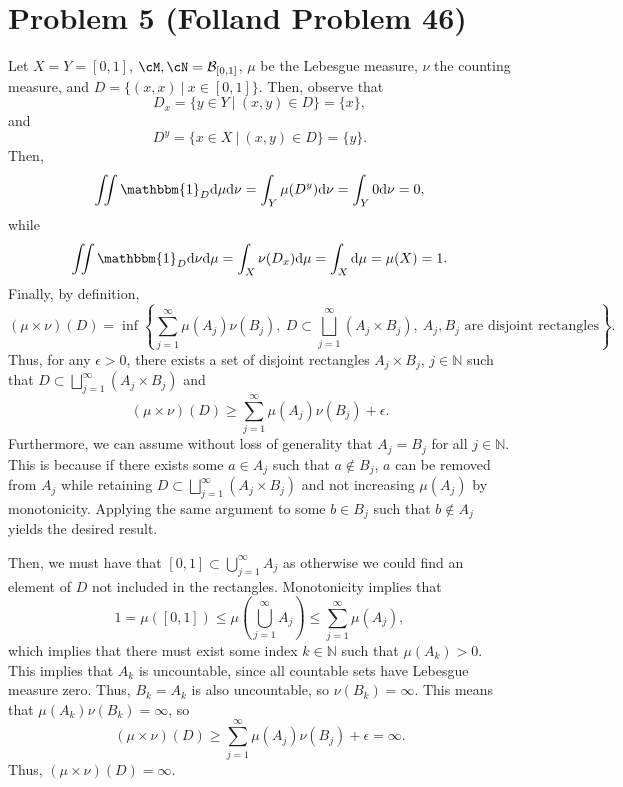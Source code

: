 \documentclass{article}
\begin{document}
\section{Problem 5 (Folland Problem 46)}
Let $X=Y=[0,1]$, $\cM,\cN=\cB_{[0,1]}$, $\mu$ be the Lebesgue measure, $\nu$ the counting measure, and $D=\{(x,x)~|~x\in[0,1]\}$. Then, observe that
\[
D_x=\{y\in Y~|~(x,y)\in D\}=\{x\},
\]
and 
\[
D^y=\{x\in X~|~(x,y)\in D\}=\{y\}.
\]
Then,
\[
\iint\mathbbm{1}_D\df\mu\df\nu=\int_Y\mu(D^y)\df\nu=\int_Y0\df\nu=0,
\]
while
\[
\iint\mathbbm{1}_D\df\nu\df\mu=\int_X\nu(D_x)\df\mu=\int_X\df\mu=\mu(X)=1.
\]
Finally, by definition,
\[
(\mu\times\nu)(D)=\inf\left\{\sum_{j=1}^\infty\mu(A_j)\nu(B_j),~D\subset\bigsqcup_{j=1}^\infty(A_j\times B_j),~A_j,B_j\text{ are disjoint rectangles}\right\}.
\]
Thus, for any $\epsilon>0$, there exists a set of disjoint rectangles $A_j\times B_j$, $j\in\mathbb{N}$ such that  $D\subset \bigsqcup_{j=1}^\infty(A_j\times B_j)$ and 
\[
(\mu\times\nu)(D)\geq\sum_{j=1}^\infty\mu(A_j)\nu(B_j)+\epsilon.
\]
Furthermore, we can assume without loss of generality that $A_j=B_j$ for all $j\in\mathbb{N}$. This is because if there exists some $a\in A_j$ such that $a\notin B_j$, $a$ can be removed from $A_j$ while retaining $D\subset \bigsqcup_{j=1}^\infty(A_j\times B_j)$ and not increasing $\mu(A_j)$ by monotonicity. Applying the same argument to some $b\in B_j$ such that $b\notin A_j$ yields the desired result. 

Then, we must have that $[0,1]\subset\bigcup_{j=1}^\infty A_j$ as otherwise we could find an element of $D$ not included in the rectangles. Monotonicity implies that
\[
1=\mu([0,1])\leq \mu\left(\bigcup_{j=1}^\infty A_j\right)\leq \sum_{j=1}^\infty \mu(A_j),
\]
which implies that there must exist some index $k\in\mathbb{N}$ such that $\mu(A_k)>0$. This implies that $A_k$ is uncountable, since all countable sets have Lebesgue measure zero. Thus, $B_k=A_k$ is also uncountable, so $\nu(B_k)=\infty$. This means that $\mu(A_k)\nu(B_k)=\infty$, so
\[
(\mu\times\nu)(D)\geq\sum_{j=1}^\infty\mu(A_j)\nu(B_j)+\epsilon=\infty.
\]
Thus, $(\mu\times\nu)(D)=\infty$.
\end{document}
